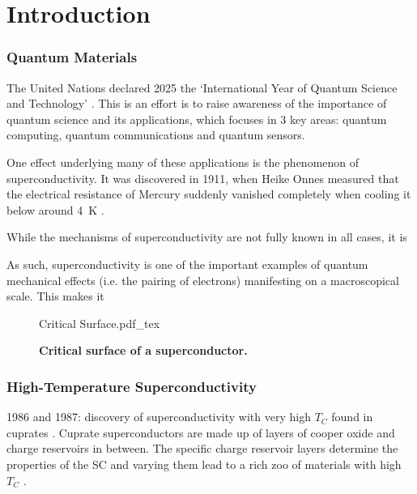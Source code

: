\documentclass[../notes.tex]{subfiles}
\begin{document}
\raggedbottom
	
\chapter{Introduction}

\subsection*{Quantum Materials}

The United Nations declared 2025 the `International Year of Quantum Science and Technology' \cite{unitednationsInternationalYearQuantum2024}.
This is an effort is to raise awareness of the importance of quantum science and its applications, which focuses in 3 key areas: quantum computing, quantum communications and quantum sensors.

One effect underlying many of these applications is the phenomenon of superconductivity.
It was discovered in 1911, when Heike Onnes measured that the electrical resistance of Mercury suddenly vanished completely when cooling it below around \qty{4}{\kelvin} \cite{onnesFurtherExperimentsLiquid1991}.

While the mechanisms of superconductivity are not fully known in all cases, it is 

As such, superconductivity is one of the important examples of quantum mechanical effects (i.e. the pairing of electrons) manifesting on a macroscopical scale.
This makes it 

\begin{SCfigure}[50][t]
	\centering
	{Critical Surface.pdf_tex}
	\caption{\textbf{Critical surface of a superconductor.}}
	\label{fig:Critical Surface of a SC}
\end{SCfigure}


\subsection*{High-Temperature Superconductivity}

1986 and 1987: discovery of superconductivity with very high \(T_C\) found in cuprates \cite{bednorzPossibleHighTc1986,uchidaHighTcSuperconductivity1987}.
Cuprate superconductors are made up of layers of cooper oxide and charge reservoirs in between.
The specific charge reservoir layers determine the properties of the SC and varying them lead to a rich zoo of materials with high \(T_C\)  \cite{rybickiPerspectivePhaseDiagram2016}.
\end{document}
